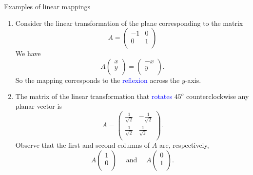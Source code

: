 \documentclass[11pt,aspectratio=169]{beamer}
\begin{document}
\begin{frame}{Examples of linear mappings}

\begin{enumerate}
\item Consider the linear transformation of the plane corresponding to the matrix
\begin{equation*} 
 A=\begin{pmatrix}
-1 & 0\\
0 & 1 \\
\end{pmatrix}
\end{equation*}
We have
\begin{equation*}
A\begin{pmatrix}x\\
y \\
\end{pmatrix}=\begin{pmatrix}-x\\
y \\
\end{pmatrix}.
\end{equation*}
So the mapping corresponds to the \textcolor{blue}{reflexion} across the $y$-axis.

\item The matrix of the linear transformation that \textcolor{blue}{rotates} $45^{o}$ counterclockwise any planar vector is
\begin{equation*} 
 A=\begin{pmatrix}
\frac{1}{\sqrt{2}} & -\frac{1}{\sqrt{2}}\\
\frac{1}{\sqrt{2}} & \frac{1}{\sqrt{2}} \\
\end{pmatrix}.
\end{equation*}
Observe that the first and second columns of $A$ are, respectively,
\begin{equation*}
A\begin{pmatrix}1\\
0 \\
\end{pmatrix} \quad \text{ and } \quad A\begin{pmatrix}0\\
1 \\
\end{pmatrix}.
\end{equation*}
\end{enumerate}\end{frame}
\end{document}
